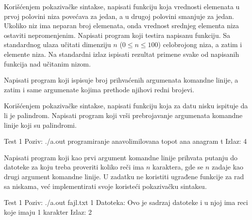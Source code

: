 \begin{Exercise}[label=303]
Korišćenjem pokazivačke sintakse, napisati funkciju koja
vrednosti elemenata u prvoj polovini niza povećava za jedan, a u
drugoj polovini smanjuje za jedan. Ukoliko niz ima neparan broj
elemenata, onda vrednost srednjeg elementa niza ostaviti
nepromenjenim. Napisati program koji testira napisanu funkciju. Sa
standardnog ulaza učitati dimenziju $n$ ($0 \le n \leq 100$)
celobrojong niza, a zatim i elemente niza. Na standardni izlaz
ispisati rezultat primene svake od napisanih funkcija nad
učitanim nizom.
\end{Exercise}
\begin{Answer}[ref=303]
\end{Answer}

\begin{Exercise}[label=304]
Napisati program koji ispisuje broj prihvaćenih argumenata
komandne linije, a zatim i same argumenate kojima prethode njihovi
redni brojevi.
\end{Exercise}
\begin{Answer}[ref=304]
\end{Answer}

\begin{Exercise}[label=305]
Korišćenjem pokazivačke sintakse, napisati funkciju koja
za datu nisku ispituje da li je palindrom. Napisati program koji
vrši prebrojavanje argumenata komandne linije koji su
palindromi.

\begin{maxitest}
\begin{test}{Test 1}
Poziv:  ./a.out programiranje anavolimilovana topot ana anagram t
Izlaz:  4
\end{test}
\end{maxitest}
\end{Exercise}
\begin{Answer}[ref=305]
\end{Answer}

\begin{Exercise}[label=306]
Napisati program koji kao prvi argument komandne linije prihvata
putanju do datoteke za koju treba proveriti koliko reči ima
$n$ karaktera, gde se $n$ zadaje kao drugi argument
komandne linije. U zadatku ne koristiti ugrađene funkcije za
rad sa niskama, već implementirati svoje koristeći
pokazivačku sintaksu.

\begin{miditest}
\begin{test}{Test 1}
Poziv:    ./a.out fajl.txt 1
Datoteka: Ovo je sadrzaj datoteke i u 
          njoj ima reci koje imaju 
          1 karakter
Izlaz:    2
\end{test}
\end{miditest}

\end{Exercise}
\begin{Answer}[ref=306]
\end{Answer}

